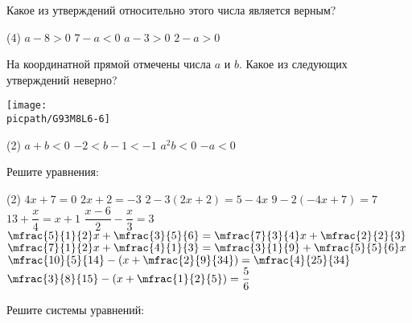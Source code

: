 \begin{class}[number=6]
\begin{listofex}
\begin{center}
		\end{center}
		Какое из утверждений относительно этого числа является верным?
		\begin{tasks}(4)
			\task \( a-8>0 \)
			\task \( 7-a<0 \)
			\task \( a-3>0 \)
			\task \( 2-a>0 \)
		\end{tasks}
		\item На координатной прямой отмечены числа \( a \) и \( b \). Какое из следующих утверждений неверно?
		\begin{center}
			\texttt{[image: \\picpath/G93M8L6-6]}
		\end{center}
		\begin{tasks}(2)
			\task \( a+b<0 \)
			\task \( -2<b-1<-1 \)
			\task \( a^2b<0 \)
			\task \( -a<0 \)
		\end{tasks}
		\item Решите уравнения:
		\begin{tasks}(2)
			\task\(4x+7=0\)
			\task \(2x+2=-3\)
			\task \(2-3(2x+2)=5-4x\)
			\task \(9-2(-4x+7)=7\)
			\task \(13+\dfrac{ x }{ 4 }=x+1\)
			\task \(\dfrac{ x-6 }{ 2 }-\dfrac{ x }{ 3 }=3\)
			\task \( \mfrac{5}{1}{2}x+\mfrac{3}{5}{6}=\mfrac{7}{3}{4}x+\mfrac{2}{2}{3} \)
			\task \( \mfrac{7}{1}{2}x+\mfrac{4}{1}{3}=\mfrac{3}{1}{9}+\mfrac{5}{5}{6}x \)
			\task \( \mfrac{10}{5}{14}-\left( x+\mfrac{2}{9}{34} \right)=\mfrac{4}{25}{34}  \)
			\task \( \mfrac{3}{8}{15}-\left( x+\mfrac{1}{2}{5} \right)=\dfrac{ 5 }{ 6 }  \)
		\end{tasks}
		\item Решите системы уравнений:
		\begin{itasks}[2]
			\task {}
			\task {}
			\task {}
			\task {}
		\end{itasks}
	\end{listofex}
\end{class}

